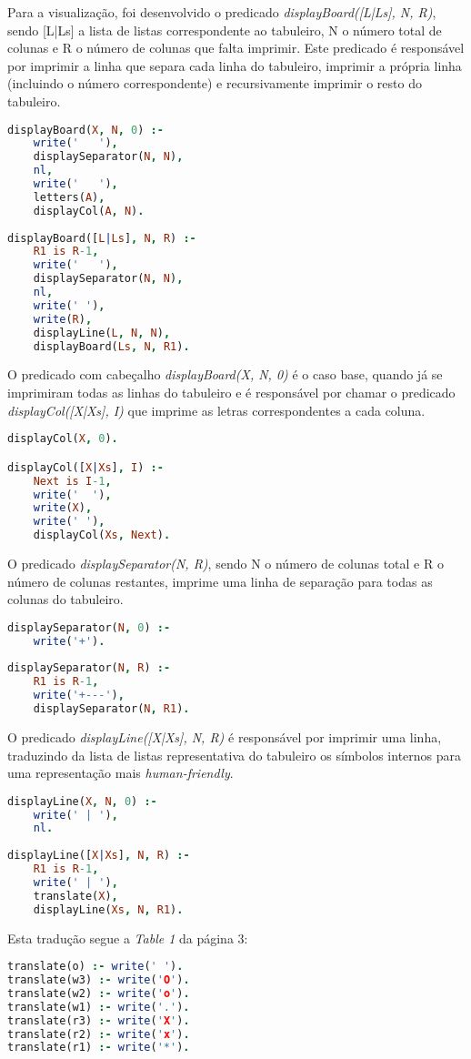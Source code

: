 \documentclass[a4paper]{article}
\begin{document}
Para a visualização, foi desenvolvido o predicado \textit{displayBoard([L|Ls], N, R)}, sendo [L|Ls] a lista de listas correspondente ao tabuleiro, N o número total de colunas e R o número de colunas que falta imprimir. Este predicado é responsável por imprimir a linha que separa cada linha do tabuleiro, imprimir a própria linha (incluindo o número correspondente) e recursivamente imprimir o resto do tabuleiro.
\bigskip
\begin{lstlisting}[language=Prolog]
displayBoard(X, N, 0) :- 
	write('   '), 
	displaySeparator(N, N), 
	nl, 
	write('   '), 
	letters(A), 
	displayCol(A, N).
	
displayBoard([L|Ls], N, R) :- 
	R1 is R-1,
	write('   '), 
	displaySeparator(N, N),
	nl, 
	write(' '), 
	write(R),
	displayLine(L, N, N),
	displayBoard(Ls, N, R1).
\end{lstlisting}
\bigskip
O predicado com cabeçalho \textit{displayBoard(X, N, 0)} é o caso base, quando já se imprimiram todas as linhas do tabuleiro e é responsável por chamar o predicado \textit{displayCol([X|Xs], I)} que imprime as letras correspondentes a cada coluna.
\bigskip
\begin{lstlisting}[language=Prolog]
displayCol(X, 0).

displayCol([X|Xs], I) :- 
	Next is I-1, 
	write('  '), 
	write(X), 
	write(' '), 
	displayCol(Xs, Next).
\end{lstlisting}
\bigskip
O predicado \textit{displaySeparator(N, R)}, sendo N o número de colunas total e R o número de colunas restantes, imprime uma linha de separação para todas as colunas do tabuleiro.
\bigskip
\begin{lstlisting}[language=Prolog]
displaySeparator(N, 0) :- 
	write('+').
	
displaySeparator(N, R) :- 
	R1 is R-1, 
	write('+---'), 
	displaySeparator(N, R1).
\end{lstlisting}
\bigskip
O predicado \textit{displayLine([X|Xs], N, R)} é responsável por imprimir uma linha, traduzindo da lista de listas representativa do tabuleiro os símbolos internos para uma representação mais \textit{human-friendly}. 
\bigskip
\begin{lstlisting}[language=Prolog]
displayLine(X, N, 0) :- 
	write(' | '), 
	nl.
	
displayLine([X|Xs], N, R) :- 
	R1 is R-1, 
	write(' | '),
	translate(X),
	displayLine(Xs, N, R1).
\end{lstlisting}
\bigskip
Esta tradução segue a \textit{Table 1} da página 3:
\bigskip
\begin{lstlisting}[language=Prolog]
translate(o) :- write(' ').
translate(w3) :- write('O').
translate(w2) :- write('o').
translate(w1) :- write('.').
translate(r3) :- write('X').
translate(r2) :- write('x').
translate(r1) :- write('*').
\end{lstlisting}
\end{document}
